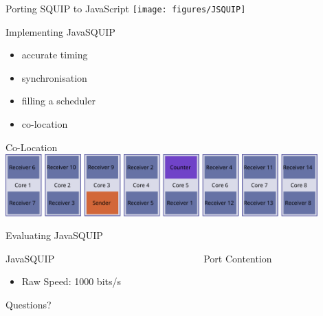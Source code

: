 \documentclass[aspectratio=169]{beamer}
\begin{document}

\begin{frame}{Porting SQUIP to JavaScript}
  \centering
  \texttt{[image: figures/JSQUIP]}
\end{frame}

\begin{frame}{Implementing JavaSQUIP}
  \begin{itemize}
    \item{accurate timing }
    \item{synchronisation }
    \item{filling a scheduler }
    \item{co-location }
  \end{itemize}
\end{frame}

\begin{frame}{Co-Location}
  \centering
   \includegraphics[page=1, width=0.9\textwidth]{figures/colocation.pdf}
\end{frame}

\begin{frame}{Evaluating JavaSQUIP}
  \begin{itemize}
  \end{itemize}
\end{frame}

\begin{frame}{JavaSQUIP~~~~~~~~~~~~~~~~~~~~~~~~~~~~~~~Port Contention}
  \begin{multicols}{2}
    \begin{itemize}
      \item Raw Speed: 1000 bits/s
    \end{itemize}
  \end{multicols}
\end{frame}

\begin{frame}[c]
  \centering
  \Large Questions?
\end{frame}
\end{document}
